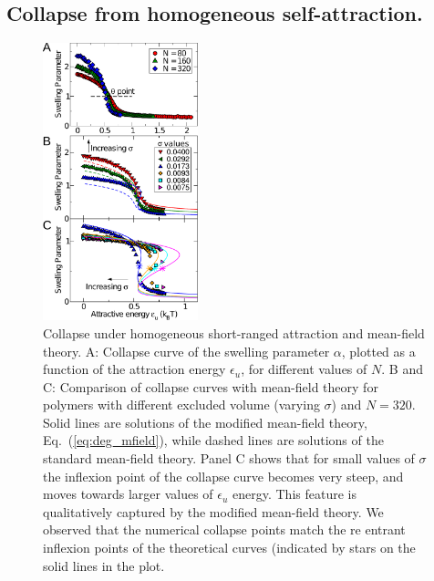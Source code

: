 \documentclass[
preprint,
a4paper,
12pt,
superscriptaddress,
pre]{revtex4}
\begin{document}

\subsection*{Collapse from homogeneous self-attraction. }


\begin{figure}
  \centering
  \includegraphics[width=0.4\textwidth]{fig2}
  \caption{Collapse under homogeneous short-ranged attraction and
    mean-field theory. A: Collapse curve of the swelling parameter
    $\alpha$, plotted as a function of the attraction energy
    $\epsilon_u$, for different values of $N$. B and C: Comparison of
    collapse curves with mean-field theory for polymers with different
    excluded volume (varying $\sigma$) and $N=320$.  Solid lines are
    solutions of the modified mean-field theory,
    Eq.~(\ref{eq:deg_mfield}), while dashed lines are solutions of the
    standard mean-field theory. Panel C shows that for small values of
    $\sigma$ the inflexion point of the collapse curve becomes very
    steep, and moves towards larger values of $\epsilon_u$
    energy. This feature is qualitatively captured by the modified
    mean-field theory. We observed that the numerical collapse points
    match the re entrant inflexion points of the theoretical curves
    (indicated by stars on the solid lines in the plot.  }
  \label{fig:2}
\end{figure}
\end{document}
